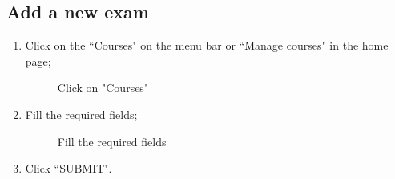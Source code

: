 \documentclass[ManualeUtente]{subfiles}
\begin{document}
\subsection{Add a new exam}
\begin{enumerate}
	\item Click on the \textquotedblleft Courses" on the menu bar or \textquotedblleft Manage courses" in the home page;
	\begin{figure}[H]
		\centering
		\caption{Click on "Courses"}
		\label{fig:Click on "Courses"}
	\end{figure}
	\item Fill the required fields;
	\begin{figure}[H]
		\centering
		\caption{Fill the required fields}
		\label{fig:Fill the required fields}
	\end{figure}
	\item Click \textquotedblleft SUBMIT".

\end{enumerate}
\end{document}

